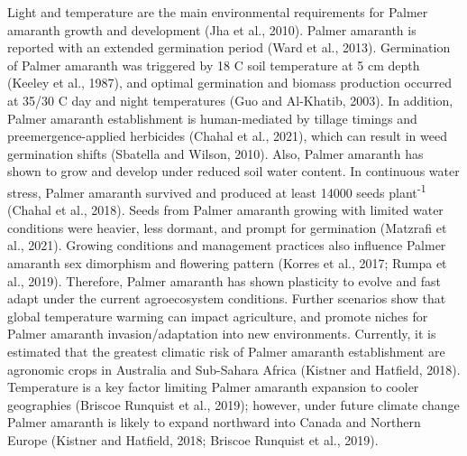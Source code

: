 \documentclass[utf8]{frontiersSCNS}
\begin{document}
Light and temperature are the main environmental requirements for Palmer
amaranth growth and development (Jha et al., 2010). Palmer amaranth is
reported with an extended germination period (Ward et al., 2013).
Germination of Palmer amaranth was triggered by 18 C soil temperature at
5 cm depth (Keeley et al., 1987), and optimal germination and biomass
production occurred at 35/30 C day and night temperatures (Guo and
Al-Khatib, 2003). In addition, Palmer amaranth establishment is
human-mediated by tillage timings and preemergence-applied herbicides
(Chahal et al., 2021), which can result in weed germination shifts
(Sbatella and Wilson, 2010). Also, Palmer amaranth has shown to grow and
develop under reduced soil water content. In continuous water stress,
Palmer amaranth survived and produced at least 14000 seeds
plant\textsuperscript{-1} (Chahal et al., 2018). Seeds from Palmer
amaranth growing with limited water conditions were heavier, less
dormant, and prompt for germination (Matzrafi et al., 2021). Growing
conditions and management practices also influence Palmer amaranth sex
dimorphism and flowering pattern (Korres et al., 2017; Rumpa et al.,
2019). Therefore, Palmer amaranth has shown plasticity to evolve and
fast adapt under the current agroecosystem conditions. Further scenarios
show that global temperature warming can impact agriculture, and promote
niches for Palmer amaranth invasion/adaptation into new environments.
Currently, it is estimated that the greatest climatic risk of Palmer
amaranth establishment are agronomic crops in Australia and Sub-Sahara
Africa (Kistner and Hatfield, 2018). Temperature is a key factor
limiting Palmer amaranth expansion to cooler geographies (Briscoe
Runquist et al., 2019); however, under future climate change Palmer
amaranth is likely to expand northward into Canada and Northern Europe
(Kistner and Hatfield, 2018; Briscoe Runquist et al., 2019).
\end{document}
